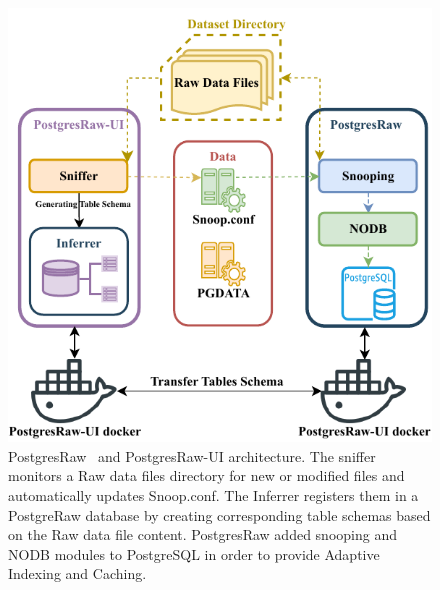 \begin{figure}[h!]
\centering
\includegraphics[width=0.9\linewidth]{img/pgRawChart.pdf}
\caption[PostgresRaw and PostgresRaw-UI architecture.]{PostgresRaw~\cite{noauthor_hbpmedicalpostgresraw_2022} and PostgresRaw-UI \cite{noauthor_hbpmedicalpostgresraw-ui_2018} architecture. The sniffer monitors a Raw data files directory for new or modified files and automatically updates Snoop.conf.  
 The Inferrer registers them in a PostgreRaw database by creating corresponding table schemas based on the Raw data file content. PostgresRaw added snooping and NODB modules to PostgreSQL in order to provide Adaptive Indexing and Caching.}
\label{fig:pgRaw-architecture}
\end{figure}